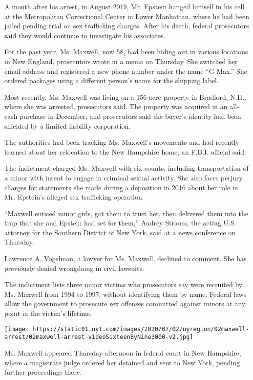 A month after his arrest, in August 2019, Mr. Epstein
\href{https://www.nytimes.com/2019/11/20/nyregion/jeffrey-epstein-death.html}{hanged
himself} in his cell at the Metropolitan Correctional Center in Lower
Manhattan, where he had been jailed pending trial on sex trafficking
charges. After his death, federal prosecutors said they would continue
to investigate his associates.

For the past year, Ms. Maxwell, now 58, had been hiding out in various
locations in New England, prosecutors wrote in a memo on Thursday. She
switched her email address and registered a new phone number under the
name ``G Max.'' She ordered packages using a different person's name for
the shipping label.

Most recently, Ms. Maxwell was living on a 156-acre property in
Bradford, N.H., where she was arrested, prosecutors said. The property
was acquired in an all-cash purchase in December, and prosecutors said
the buyer's identity had been shielded by a limited liability
corporation.

The authorities had been tracking Ms. Maxwell's movements and had
recently learned about her relocation to the New Hampshire home, an
F.B.I. official said.

The indictment charged Ms. Maxwell with six counts, including
transportation of a minor with intent to engage in criminal sexual
activity. She also faces perjury charges for statements she made during
a deposition in 2016 about her role in Mr. Epstein's alleged sex
trafficking operation.

``Maxwell enticed minor girls, got them to trust her, then delivered
them into the trap that she and Epstein had set for them,'' Audrey
Strauss, the acting U.S. attorney for the Southern District of New York,
said at a news conference on Thursday.

Lawrence A. Vogelman, a lawyer for Ms. Maxwell, declined to comment. She
has previously denied wrongdoing in civil lawsuits.

The indictment lists three minor victims who prosecutors say were
recruited by Ms. Maxwell from 1994 to 1997, without identifying them by
name. Federal laws allow the government to prosecute sex offenses
committed against minors at any point in the victim's lifetime.

\texttt{[image: https://static01.nyt.com/images/2020/07/02/nyregion/02maxwell-arrest/02maxwell-arrest-videoSixteenByNine3000-v2.jpg]}

Ms. Maxwell appeared Thursday afternoon in federal court in New
Hampshire, where a magistrate judge ordered her detained and sent to New
York, pending further proceedings there.

